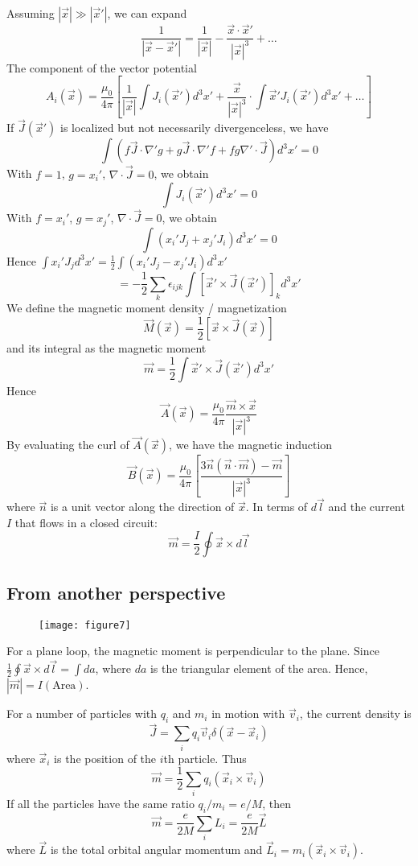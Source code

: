\documentclass{article}
\begin{document}
	Assuming $|\vec{x}| \gg |\vec{x}'|$, we can expand
	\[
	\frac{1}{|\vec{x}-\vec{x}'|} = \frac{1}{|\vec{x}|} - \frac{\vec{x} \cdot \vec{x}'}{|\vec{x}|^3} + \dots
	\]
	The component of the vector potential
	\[
	A_i(\vec{x}) = \frac{\mu_0}{4\pi} \left[ \frac{1}{|\vec{x}|} \int J_i(\vec{x}') d^3x' + \frac{\vec{x}}{|\vec{x}|^3} \cdot \int \vec{x}' J_i(\vec{x}') d^3x' + \dots \right]
	\]
	If $\vec{J}(\vec{x}')$ is localized but not necessarily divergenceless, we have
	\[
	\int (f \vec{J} \cdot \nabla'g + g\vec{J} \cdot \nabla'f + fg \nabla' \cdot \vec{J}) d^3x' = 0
	\]
	With $f=1$, $g=x_i'$, $\nabla \cdot \vec{J}=0$, we obtain
	\[
	\int J_i(\vec{x}') d^3x' = 0
	\]
	With $f=x_i'$, $g=x_j'$, $\nabla \cdot \vec{J}=0$, we obtain
	\[
	\int (x_i' J_j + x_j' J_i) d^3x' = 0
	\]
	Hence $\int x_i' J_j d^3x' = \frac{1}{2} \int (x_i' J_j - x_j' J_i) d^3x'$
	\[
	= -\frac{1}{2} \sum_k \epsilon_{ijk} \int [\vec{x}' \times \vec{J}(\vec{x}')]_k d^3x'
	\]
	We define the magnetic moment density / magnetization
	\[
	\vec{M}(\vec{x}) = \frac{1}{2} [\vec{x} \times \vec{J}(\vec{x})]
	\]
	and its integral as the magnetic moment
	\[
	\vec{m} = \frac{1}{2} \int \vec{x}' \times \vec{J}(\vec{x}') d^3x'
	\]
	Hence
	\[
	\vec{A}(\vec{x}) = \frac{\mu_0}{4\pi} \frac{\vec{m} \times \vec{x}}{|\vec{x}|^3}
	\]
	By evaluating the curl of $\vec{A}(\vec{x})$, we have the magnetic induction
	\[
	\vec{B}(\vec{x}) = \frac{\mu_0}{4\pi} \left[ \frac{3\vec{n}(\vec{n}\cdot\vec{m})-\vec{m}}{|\vec{x}|^3} \right]
	\]
	where $\vec{n}$ is a unit vector along the direction of $\vec{x}$.
	In terms of $d\vec{l}$ and the current $I$ that flows in a closed circuit:
	\[
	\vec{m} = \frac{I}{2} \oint \vec{x} \times d\vec{l}
	\]
	
	\subsection*{From another perspective}
	
	\begin{figure}[h]
		\centering
		\texttt{[image: figure7]}
		\caption{}
		\label{fig:figure7}
	\end{figure}
	
	
	For a plane loop, the magnetic moment is perpendicular to the plane. Since $\frac{1}{2} \oint \vec{x} \times d\vec{l} = \int da$, where $da$ is the triangular element of the area.
	Hence, $|\vec{m}| = I(\text{Area})$.
	
	For a number of particles with $q_i$ and $m_i$ in motion with $\vec{v}_i$, the current density is
	\[
	\vec{J} = \sum_i q_i \vec{v}_i \delta(\vec{x}-\vec{x}_i)
	\]
	where $\vec{x}_i$ is the position of the $i$th particle.
	Thus
	\[
	\vec{m} = \frac{1}{2} \sum_i q_i (\vec{x}_i \times \vec{v}_i)
	\]
	If all the particles have the same ratio $q_i/m_i = e/M$, then
	\[
	\vec{m} = \frac{e}{2M} \sum_i L_i = \frac{e}{2M} \vec{L}
	\]
	where $\vec{L}$ is the total orbital angular momentum and $\vec{L}_i = m_i(\vec{x}_i \times \vec{v}_i)$.
	
\end{document}

